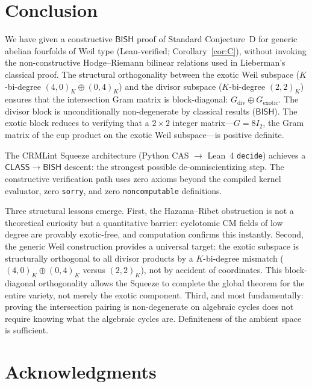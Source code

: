 \documentclass[11pt]{article}
\theoremstyle{plain}
\theoremstyle{definition}
\theoremstyle{remark}
\newcommand{\BISH}{\mathsf{BISH}}
\newcommand{\CLASS}{\mathsf{CLASS}}
\begin{document}
\section{Conclusion}
\label{sec:conclusion}

We have given a constructive $\BISH$ proof of Standard Conjecture~D for
generic abelian fourfolds of Weil type (Lean-verified;
Corollary~\ref{cor:C}), without invoking the non-constructive
Hodge--Riemann bilinear relations used in Lieberman's classical proof.
The structural orthogonality between the exotic Weil subspace ($K$-bi-degree
$(4,0)_K \oplus (0,4)_K$) and the divisor subspace ($K$-bi-degree
$(2,2)_K$) ensures that the intersection Gram matrix is block-diagonal:
$G_{\mathrm{div}} \oplus G_{\mathrm{exotic}}$.  The divisor block is
unconditionally non-degenerate by classical results ($\BISH$).  The exotic
block reduces to verifying that a $2 \times 2$ integer matrix---$G = 8I_2$,
the Gram matrix of the cup product on the exotic Weil subspace---is positive
definite.

The CRMLint Squeeze architecture (Python CAS $\to$ Lean~4
\texttt{decide}) achieves a $\CLASS \to \BISH$ descent: the
strongest possible de-omniscientizing step.  The constructive verification
path uses zero axioms beyond the compiled kernel evaluator, zero
\texttt{sorry}, and zero \texttt{noncomputable} definitions.

Three structural lessons emerge.  First, the Hazama--Ribet obstruction
is not a theoretical curiosity but a quantitative barrier: cyclotomic
CM fields of low degree are provably exotic-free, and computation confirms
this instantly.  Second, the generic Weil construction provides a universal
target: the exotic subspace is structurally orthogonal to all divisor
products by a $K$-bi-degree mismatch ($(4,0)_K\oplus(0,4)_K$ versus
$(2,2)_K$), not by accident of coordinates.  This block-diagonal
orthogonality allows the Squeeze to complete the global theorem for the
entire variety, not merely the exotic component.  Third, and most
fundamentally: proving the intersection pairing is non-degenerate on
algebraic cycles does not require knowing what the algebraic cycles are.
Definiteness of the ambient space is sufficient.


\section*{Acknowledgments}
\end{document}
